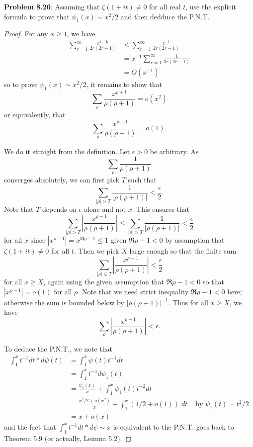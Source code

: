 \documentclass[12pt]{article}
\newcommand{\Abs}[1]{\left| #1 \right|}
\begin{document}
\fi

\textbf{Problem 8.26}: Assuming that $\zeta(1 + it) \not= 0$ for all real $t$, use the explicit formula to prove that $\psi_1(x) \sim x^2/2$ and then dedduce the P.N.T.

\begin{proof}
For any $x \geq 1$, we have
\begin{align*}
\sum_{r = 1}^{\infty} \frac{x^{1-2r}}{2r(2r - 1)} &\leq \sum_{r = 1}^{\infty} \frac{x^{-1}}{2r(2r - 1)}\\
&= x^{-1} \sum_{r = 1}^{\infty} \frac{1}{2r(2r - 1)}\\
&= O(x^{-1})
\end{align*}
so to prove $\psi_1(x) \sim x^2/2$, it remains to show that
$$\sum_{\rho} \frac{x^{\rho + 1}}{\rho(\rho + 1)} = o(x^2)$$
or equivalently, that
$$\sum_{\rho} \frac{x^{\rho - 1}}{\rho(\rho + 1)} = o(1).$$

We do it straight from the definition. Let $\epsilon > 0$ be arbitrary. As
$$\sum_\rho \frac{1}{\rho(\rho + 1)}$$
converges absolutely, we can first pick $T$ such that
$$\sum_{|\rho| > T} \frac{1}{|\rho(\rho + 1)|} < \frac{\epsilon}{2}.$$
Note that $T$ depends on $\epsilon$ alone and not $x$. This ensures that
$$\sum_{|\rho| > T} \Abs{ \frac{x^{\rho - 1}}{\rho(\rho + 1)} } \leq \sum_{|\rho| > T} \frac{1}{|\rho(\rho + 1)|} < \frac{\epsilon}{2}$$
for all $x$ since $|x^{\rho - 1}| = x^{\Re \rho - 1} \leq 1$ given $\Re \rho - 1 < 0$ by assumption that $\zeta(1 + it) \not= 0$ for all $t$. Then we pick $X$ large enough so that the finite sum
$$\sum_{|\rho| \leq T} \Abs{ \frac{x^{\rho - 1}}{\rho(\rho + 1)} } < \frac{\epsilon}{2}$$
for all $x \geq X$, again using the given assumption that $\Re \rho - 1 < 0$ so that $|x^{\rho - 1}| = o(1)$ for all $\rho$. Note that we need strict inequality $\Re \rho - 1 < 0$ here; otherwise the sum is bounded below by $|\rho(\rho+1)|^{-1}$. Thus for all $x \geq X$, we have
$$\sum_{\rho} \Abs{\frac{x^{\rho - 1}}{\rho(\rho + 1)}} < \epsilon.$$

To deduce the P.N.T., we note that
\begin{align*}
\int_1^x t^{-1} dt * d\psi(t) &= \int_1^x \psi(t) t^{-1} dt\\
&= \int_1^x t^{-1} d \psi_1(t)\\
&= \frac{\psi_1(x)}{x} + \int_1^x \psi_1(t) t^{-2} dt\\
&= \frac{x^2/2 + o(x^2)}{x} + \int_1^x (1/2 + o(1)) \; dt &\text{ by } \psi_1(t) \sim t^2/2 \\
&= x + o(x)
\end{align*}
and the fact that $\int_1^x t^{-1} dt * d\psi \sim x$ is equivalent to the P.N.T. goes back to Theorem 5.9 (or actually, Lemma 5.2).
\end{proof}
\end{document}
